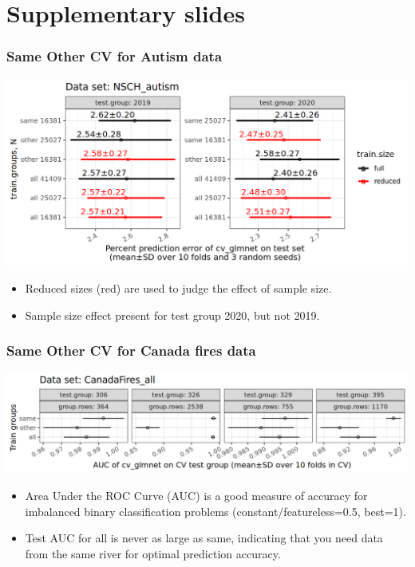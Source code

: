 \documentclass{beamer}
\begin{document}
\section{Supplementary slides}

\begin{frame}
  \frametitle{Same Other CV for Autism data}
  \includegraphics[width=\textwidth]{NSCH_autism_error_glmnet_sizes_mean_sd_more.png}
  \begin{itemize}
  \item Reduced sizes (red) are used to judge the effect of sample size.
  \item Sample size effect present for test group 2020, but not 2019.
  \end{itemize}
\end{frame}

\begin{frame}
  \frametitle{Same Other CV for Canada fires data}
  \includegraphics[width=\textwidth]{CanadaFires_all_AUC_glmnet_mean_SD.png}
  \begin{itemize}
  \item Area Under the ROC Curve (AUC) is a good measure of accuracy
    for imbalanced binary classification problems (constant/featureless=0.5, best=1).
  \item Test AUC for all is never as large as same, indicating that
    you need data from the same river for optimal prediction accuracy.
  \end{itemize}
\end{frame}
\end{document}
